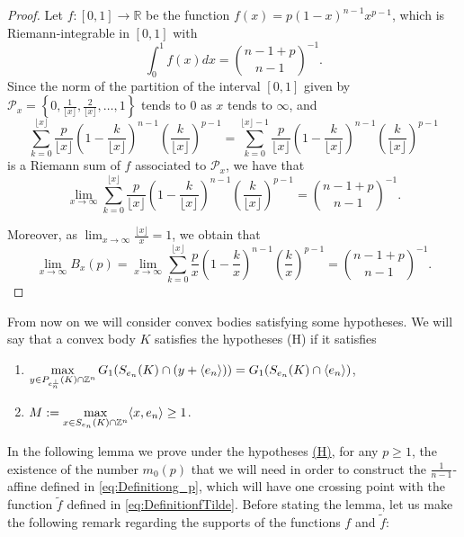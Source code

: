 \documentclass[10pt]{amsart}
\def\R{\mathbb{R}}
\def\Z{\mathbb{Z}}
\numberwithin{equation}{section}
\begin{document}
\begin{proof}
Let $f:[0,1]\to\R$ be the function $f(x)=p(1-x)^{n-1}x^{p-1}$, which is Riemann-integrable in $[0,1]$ with
$$
\int_0^1 f(x)dx={{n-1+p}\choose{n-1}}^{-1}.
$$
Since the norm of the partition of the interval $[0,1]$ given by $\mathcal{P}_x=\left\{0,\frac{1}{\lfloor x\rfloor},\frac{2}{\lfloor x\rfloor},\dots,1\right\}$ tends to $0$ as $x$ tends to $\infty$, and
$$
\sum_{k=0}^{\lfloor x\rfloor}\frac{p}{\lfloor x\rfloor}\left(1-\frac{k}{\lfloor x\rfloor}\right)^{n-1}\left(\frac{k}{\lfloor x\rfloor}\right)^{p-1}=\sum_{k=0}^{\lfloor x\rfloor-1}\frac{p}{\lfloor x\rfloor}\left(1-\frac{k}{\lfloor x\rfloor}\right)^{n-1}\left(\frac{k}{\lfloor x\rfloor}\right)^{p-1}
$$
is a Riemann sum of $f$ associated to $\mathcal{P}_x$, we have that
$$
\lim_{x\to\infty}\sum_{k=0}^{\lfloor x\rfloor}\frac{p}{\lfloor x\rfloor}\left(1-\frac{k}{\lfloor x\rfloor}\right)^{n-1}\left(\frac{k}{\lfloor x\rfloor}\right)^{p-1}={{n-1+p}\choose{n-1}}^{-1}.
$$

Moreover, as $\displaystyle{\lim_{x\to\infty}\frac{\lfloor x\rfloor}{x}=1}$, we obtain that
$$
\lim_{x\to\infty} B_{x}(p)=\lim_{x\to\infty}\sum_{k=0}^{\lfloor x\rfloor}\frac{p}{x}\left(1-\frac{k}{x}\right)^{n-1}\left(\frac{k}{x}\right)^{p-1}={{n-1+p}\choose{n-1}}^{-1}.
$$
\end{proof}

From now on we will consider convex bodies satisfying some hypotheses. We will say that a convex body $K$ satisfies the hypotheses \hypertarget{(H)}{(H)} if it satisfies
\begin{enumerate}
\item[a)] $\displaystyle{\label{Hypotheses1}\max_{y\in P_{e_n^\perp}(K)\cap\Z^n}G_1(S_{e_n}(K)\cap(y+\langle e_n\rangle))=G_1(S_{e_n}(K)\cap\langle e_n\rangle)}$,
\item[b)] $\displaystyle{\label{Hypotheses2}M:=\max_{x\in S_{e_n}(K)\cap\Z^n}\langle x,e_n\rangle\geq 1}$.
\end{enumerate}

In the following lemma we prove under the hypotheses \hyperlink{(H)}{(H)}, for any $p\geq1$, the existence of the number $m_0(p)$ that we will need in order to construct the  $\frac{1}{n-1}$-affine defined in \eqref{eq:Definitiong_p}, which will have one crossing point with the function $\tilde{f}$ defined in \eqref{eq:DefinitionfTilde}. Before stating the lemma, let us make the following remark regarding the supports of the functions $f$ and $\tilde{f}$:
\end{document}
